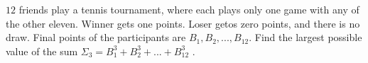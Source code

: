 $12$ friends play a tennis tournament, where each plays only one game with any of the other eleven. Winner gets one points. Loser getos zero points, and there is no draw. Final points of the participants are $B_1, B_2, ..., B_{12}$. Find the largest possible value of the sum $\Sigma_3=B_1^3+B_2^3+ ... + B_{12}^3$ .